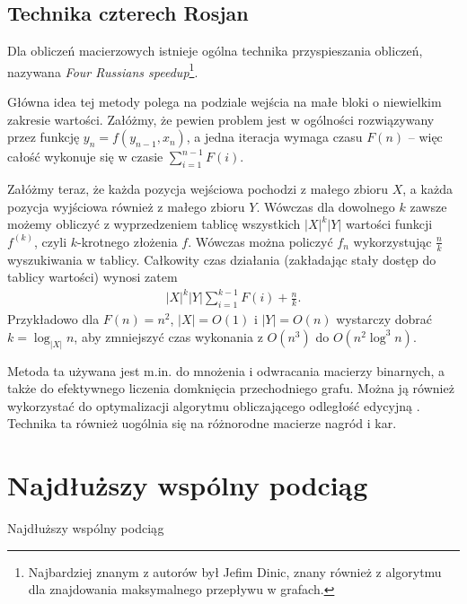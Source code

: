 \subsection{Technika czterech Rosjan}

Dla obliczeń macierzowych istnieje ogólna technika przyspieszania obliczeń, nazywana \emph{Four Russians speedup}\footnote{Najbardziej znanym z autorów był Jefim Dinic, znany również z algorytmu dla znajdowania maksymalnego przepływu w grafach.}.

Główna idea tej metody polega na podziale wejścia na małe bloki o niewielkim zakresie wartości.
Załóżmy, że pewien problem jest w ogólności rozwiązywany przez funkcję $y_n = f(y_{n - 1}, x_n)$, a jedna iteracja wymaga czasu $F(n)$ -- więc całość wykonuje się w czasie $\sum_{i = 1}^{n - 1} F(i)$.

Załóżmy teraz, że każda pozycja wejściowa pochodzi z małego zbioru $X$, a każda pozycja wyjściowa również z małego zbioru $Y$.
Wówczas dla dowolnego $k$ zawsze możemy obliczyć z wyprzedzeniem tablicę wszystkich $|X|^k |Y|$ wartości funkcji $f^{(k)}$, czyli $k$-krotnego złożenia $f$.
Wówczas można policzyć $f_n$ wykorzystując $\frac{n}{k}$ wyszukiwania w tablicy. Całkowity czas działania (zakładając stały dostęp do tablicy wartości) wynosi zatem
\begin{align*}
  |X|^k |Y| \sum_{i = 1}^{k - 1} F(i) + \frac{n}{k}.
\end{align*}
Przykładowo dla $F(n) = n^2$, $|X| = O(1)$ i $|Y| = O(n)$ wystarczy dobrać $k = \log_{|X|}{n}$, aby zmniejszyć czas wykonania z $O(n^3)$ do $O(n^2 \log^3{n})$.

Metoda ta używana jest m.in. do mnożenia i odwracania macierzy binarnych, a także do efektywnego liczenia domknięcia przechodniego grafu. Można ją również wykorzystać do optymalizacji algorytmu obliczającego odległość edycyjną \citep{masek1980faster}. Technika ta również uogólnia się na różnorodne macierze nagród i kar.


\section{Najdłuższy wspólny podciąg}

\begin{algorithm}[H]
    \caption{Najdłuższy wspólny podciąg}
\end{algorithm}

